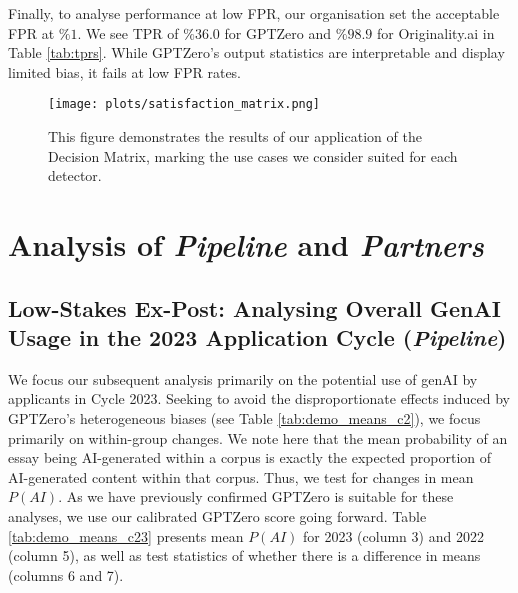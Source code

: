 Finally, to analyse performance at low FPR, our organisation set the acceptable FPR at $\%1$. We see TPR of $\%36.0$ for GPTZero and $\%98.9$ for Originality.ai in Table \ref{tab:tprs}. While GPTZero's output statistics are interpretable and display limited bias, it fails at low FPR rates.

\begin{figure}[htbp]
  \centering
  \texttt{[image: plots/satisfaction\_matrix.png]}
  \caption{This figure demonstrates the results of our application of the Decision Matrix, marking the use cases we consider suited for each detector.}
  \label{fig:satisfaction_matrix}
\end{figure}

\section{Analysis of \emph{Pipeline} and \emph{Partners}}\label{ssec:decisions}

\subsection{Low-Stakes Ex-Post: Analysing Overall GenAI Usage in the 2023 Application Cycle (\emph{Pipeline})}
We focus our subsequent analysis primarily on the potential use of genAI by applicants in Cycle 2023. Seeking to avoid the disproportionate effects induced by GPTZero's heterogeneous biases (see Table \ref{tab:demo_means_c2}), we focus primarily on within-group changes. We note here that the mean probability of an essay being AI-generated within a corpus is exactly the expected proportion of AI-generated content within that corpus. Thus, we test for changes in mean $P(AI)$. As we have previously confirmed GPTZero is suitable for these analyses, we use our calibrated GPTZero score going forward. Table \ref{tab:demo_means_c23} presents mean $P(AI)$ for 2023 (column 3) and 2022 (column 5), as well as test statistics of whether there is a difference in means (columns 6 and 7). 

